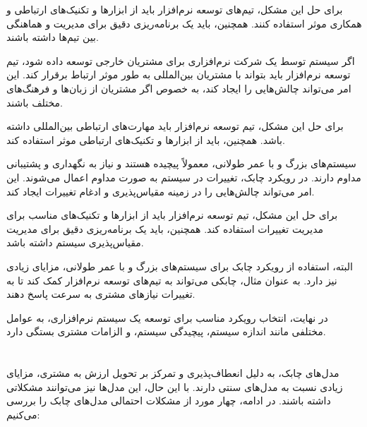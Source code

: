 برای حل این مشکل، تیم‌های توسعه نرم‌افزار باید از ابزارها و تکنیک‌های ارتباطی و همکاری موثر استفاده کنند. همچنین، باید یک برنامه‌ریزی دقیق برای مدیریت و هماهنگی بین تیم‌ها داشته باشند.

اگر سیستم توسط یک شرکت نرم‌افزاری برای مشتریان خارجی توسعه داده شود، تیم توسعه نرم‌افزار باید بتواند با مشتریان بین‌المللی به طور موثر ارتباط برقرار کند. این امر می‌تواند چالش‌هایی را ایجاد کند، به خصوص اگر مشتریان از زبان‌ها و فرهنگ‌های مختلف باشند.

برای حل این مشکل، تیم توسعه نرم‌افزار باید مهارت‌های ارتباطی بین‌المللی داشته باشد. همچنین، باید از ابزارها و تکنیک‌های ارتباطی موثر استفاده کند.

سیستم‌های بزرگ و با عمر طولانی، معمولاً پیچیده هستند و نیاز به نگهداری و پشتیبانی مداوم دارند. در رویکرد چابک، تغییرات در سیستم به صورت مداوم اعمال می‌شوند. این امر می‌تواند چالش‌هایی را در زمینه مقیاس‌پذیری و ادغام تغییرات ایجاد کند.

برای حل این مشکل، تیم توسعه نرم‌افزار باید از ابزارها و تکنیک‌های مناسب برای مدیریت تغییرات استفاده کند. همچنین، باید یک برنامه‌ریزی دقیق برای مدیریت مقیاس‌پذیری سیستم داشته باشد.

البته، استفاده از رویکرد چابک برای سیستم‌های بزرگ و با عمر طولانی، مزایای زیادی نیز دارد. به عنوان مثال، چابکی می‌تواند به تیم‌های توسعه نرم‌افزار کمک کند تا به تغییرات نیازهای مشتری به سرعت پاسخ دهند.

در نهایت، انتخاب رویکرد مناسب برای توسعه یک سیستم نرم‌افزاری، به عوامل مختلفی مانند اندازه سیستم، پیچیدگی سیستم، و الزامات مشتری بستگی دارد.

\section*{}

مدل‌های چابک، به دلیل انعطاف‌پذیری و تمرکز بر تحویل ارزش به مشتری، مزایای زیادی نسبت به مدل‌های سنتی دارند. با این حال، این مدل‌ها نیز می‌توانند مشکلاتی داشته باشند. در ادامه، چهار مورد از مشکلات احتمالی مدل‌های چابک را بررسی می‌کنیم:

